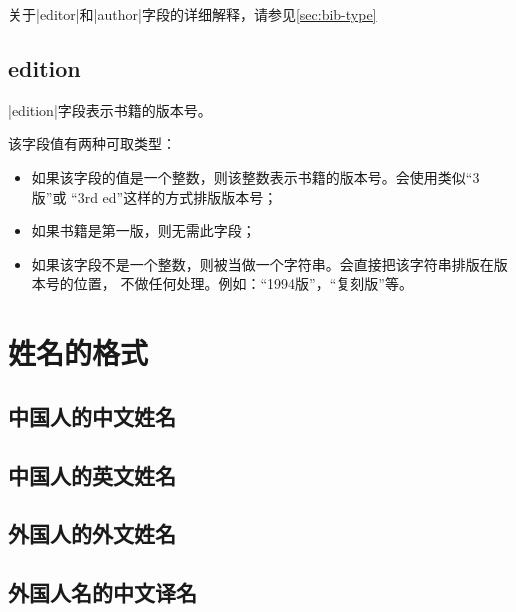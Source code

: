 关于|editor|和|author|字段的详细解释，请参见\autoref{sec:bib-type}

\subsection{edition}

|edition|字段表示书籍的版本号。

该字段值有两种可取类型：
\begin{itemize}
\item 如果该字段的值是一个整数，则该整数表示书籍的版本号。{\BibTeX}会使用类似``3版''或
``3rd ed''这样的方式排版版本号；
\item 如果书籍是第一版，则无需此字段；
\item 如果该字段不是一个整数，则被当做一个字符串。{\BibTeX}会直接把该字符串排版在版本号的位置，
不做任何处理。例如：``1994版''，``复刻版''等。
\end{itemize}


\section{姓名的格式}

\subsection{中国人的中文姓名}

\subsection{中国人的英文姓名}

\subsection{外国人的外文姓名}

\subsection{外国人名的中文译名}


